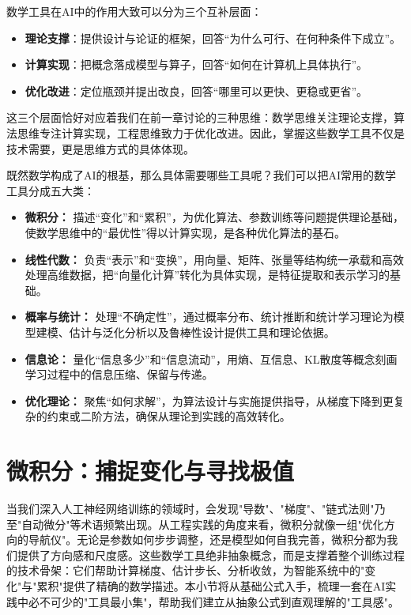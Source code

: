 数学工具在AI中的作用大致可以分为三个互补层面：
\begin{itemize}
\item \textbf{理论支撑}：提供设计与论证的框架，回答“为什么可行、在何种条件下成立”。 
\item \textbf{计算实现}：把概念落成模型与算子，回答“如何在计算机上具体执行”。 
\item \textbf{优化改进}：定位瓶颈并提出改良，回答“哪里可以更快、更稳或更省”。
\end{itemize}

这三个层面恰好对应着我们在前一章讨论的三种思维：数学思维关注理论支撑，算法思维专注计算实现，工程思维致力于优化改进。因此，掌握这些数学工具不仅是技术需要，更是思维方式的具体体现。

既然数学构成了AI的根基，那么具体需要哪些工具呢？我们可以把AI常用的数学工具分成五大类：
\begin{itemize}
  \item \textbf{微积分：} 描述“变化”和“累积”，为优化算法、参数训练等问题提供理论基础，使数学思维中的“最优性”得以计算实现，是各种优化算法的基石。
  \item \textbf{线性代数：} 负责“表示”和“变换”，用向量、矩阵、张量等结构统一承载和高效处理高维数据，把“向量化计算”转化为具体实现，是特征提取和表示学习的基础。
  \item \textbf{概率与统计：} 处理“不确定性”，通过概率分布、统计推断和统计学习理论为模型建模、估计与泛化分析以及鲁棒性设计提供工具和理论依据。
  \item \textbf{信息论：} 量化“信息多少”和“信息流动”，用熵、互信息、KL散度等概念刻画学习过程中的信息压缩、保留与传递。
  \item \textbf{优化理论：} 聚焦“如何求解”，为算法设计与实施提供指导，从梯度下降到更复杂的约束或二阶方法，确保从理论到实践的高效转化。
\end{itemize}


\section{微积分：捕捉变化与寻找极值}

当我们深入人工神经网络训练的领域时，会发现"导数"、"梯度"、"链式法则"乃至"自动微分"等术语频繁出现。从工程实践的角度来看，微积分就像一组"优化方向的导航仪"。无论是参数如何步步调整，还是模型如何自我完善，微积分都为我们提供了方向感和尺度感。这些数学工具绝非抽象概念，而是支撑着整个训练过程的技术骨架：它们帮助计算梯度、估计步长、分析收敛，为智能系统中的"变化"与"累积"提供了精确的数学描述。本小节将从基础公式入手，梳理一套在AI实践中必不可少的"工具最小集"，帮助我们建立从抽象公式到直观理解的"工具感"。


